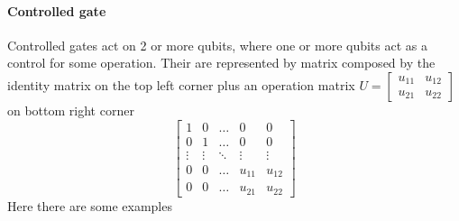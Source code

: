 \documentclass[main.tex]{subfiles}
\begin{document}
	\paragraph{Controlled gate}
	Controlled gates act on 2 or more qubits, where one or more qubits act as a control for some 
	operation. Their are represented by matrix composed by the identity matrix on the top left corner plus an operation matrix 
	$
	U=
	\begin{bmatrix}
	u_{11} & u_{12}\\
	u_{21} & u_{22}
	\end{bmatrix}
	$
	on bottom right corner
	\begin{equation}
	\begin{bmatrix}
	1 & 0 & \dots & 0 & 0\\
	0 & 1 & \dots & 0 & 0\\
	\vdots & \vdots & \ddots & \vdots & \vdots\\
	0 & 0 & \dots & u_{11} & u_{12}\\
	0 & 0 & \dots & u_{21} & u_{22}
	\end{bmatrix}
	\end{equation}
	Here there are some examples
\end{document}
